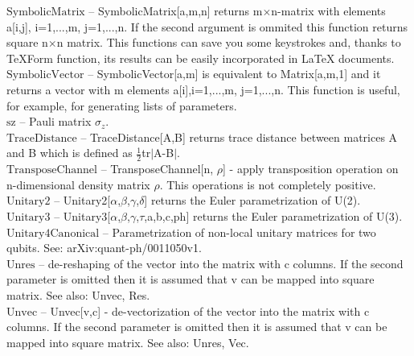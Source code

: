 \documentclass[a4paper,10pt]{scrartcl}
\begin{document}
\textbf{$ \text{SymbolicMatrix} $ }-- SymbolicMatrix[a,m,n] returns m$\times $n-matrix with elements a[i,j], i=1,...,m, j=1,...,n. If the second argument is ommited this function returns square n$\times $n matrix. This functions can save you some keystrokes and, thanks to TeXForm function, its results can be easily incorporated in LaTeX documents.$  $\\

\textbf{$ \text{SymbolicVector} $ }-- SymbolicVector[a,m] is equivalent to Matrix[a,m,1] and it returns a vector with m elements a[i],i=1,...,m, j=1,...,n. This function is useful, for example, for generating lists of parameters.$  $\\

\textbf{$ \text{sz} $ }-- Pauli matrix $ \sigma _z. $\\

\textbf{$ \text{TraceDistance} $ }-- TraceDistance[A,B] returns trace distance between matrices A and B which is defined as $ \frac{1}{2} $tr$|$A-B$|$.$  $\\

\textbf{$ \text{TransposeChannel} $ }-- TransposeChannel[n, $\rho $] - apply transposition operation on n-dimensional density matrix $\rho $. This operations is not completely positive.$  $\\

\textbf{$ \text{Unitary2} $ }-- Unitary2[$\alpha $,$\beta $,$\gamma $,$\delta $] returns the Euler parametrization of U(2).$  $\\

\textbf{$ \text{Unitary3} $ }-- Unitary3[$\alpha $,$\beta $,$\gamma $,$\tau $,a,b,c,ph] returns the Euler parametrization of U(3).$  $\\

\textbf{$ \text{Unitary4Canonical} $ }-- Parametrization of non-local unitary matrices for two qubits. See: arXiv:quant-ph/0011050v1.$  $\\

\textbf{$ \text{Unres} $ }-- de-reshaping of the vector into the matrix with c columns. If the second parameter is omitted then it is assumed that v can be mapped into square matrix. See also: Unvec, Res.$  $\\

\textbf{$ \text{Unvec} $ }-- Unvec[v,c] - de-vectorization of the vector into the matrix with c columns. If the second parameter is omitted then it is assumed that v can be mapped into square matrix. See also: Unres, Vec.$  $\\
\end{document}
